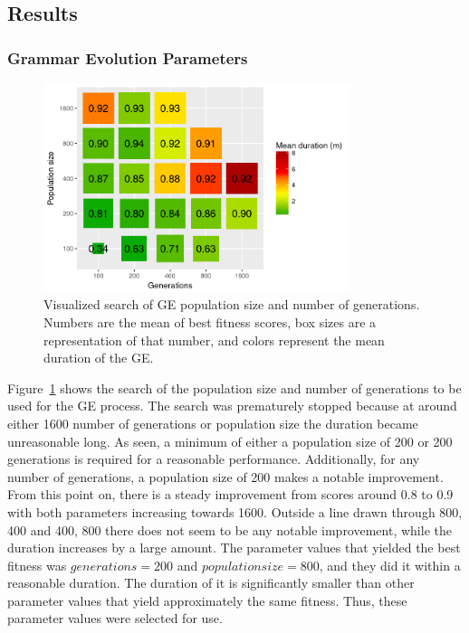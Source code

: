 \subsection{Results}
\subsubsection{Grammar Evolution Parameters}
\begin{figure}
    \centering
    \includegraphics[width=0.8\textwidth]{figures/ge-size-sampling}
    \caption[Visualized search of GE population size and number of generations]{Visualized search of GE population size and number of generations. Numbers are the mean of best fitness scores, box sizes are a representation of that number, and colors represent the mean duration of the GE.}
    \label{fig:size-sampling}
\end{figure}

Figure~\ref{fig:size-sampling} shows the search of the population size and number of generations to be used for the GE process.
The search was prematurely stopped because at around either 1600 number of generations or population size the duration became unreasonable long.
As seen, a minimum of either a population size of 200 or 200 generations is required for a reasonable performance.
Additionally, for any number of generations, a population size of 200 makes a notable improvement.
From this point on, there is a steady improvement from scores around 0.8 to 0.9 with both parameters increasing towards 1600.
Outside a line drawn through 800, 400 and 400, 800 there does not seem to be any notable improvement, while the duration increases by a large amount.
The parameter values that yielded the best fitness was $generations = 200$ and $population size = 800$, and they did it within a reasonable duration.
The duration of it is significantly smaller than other parameter values that yield approximately the same fitness.
Thus, these parameter values were selected for use.


